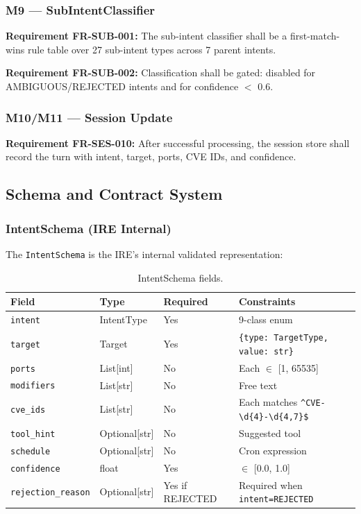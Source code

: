 \documentclass[10pt,journal,onecolumn]{IEEEtran}
\newcommand{\reqid}[1]{\textbf{#1}}
\begin{document}
\subsubsection{M9 --- SubIntentClassifier}
\reqid{Requirement FR-SUB-001:} The sub-intent classifier shall be a first-match-wins rule table over 27 sub-intent types across 7 parent intents.

\reqid{Requirement FR-SUB-002:} Classification shall be gated: disabled for AMBIGUOUS/REJECTED intents and for confidence $<$ 0.6.

\subsubsection{M10/M11 --- Session Update}
\reqid{Requirement FR-SES-010:} After successful processing, the session store shall record the turn with intent, target, ports, CVE IDs, and confidence.
\subsection{Schema and Contract System}

\subsubsection{IntentSchema (IRE Internal)}
The \texttt{IntentSchema} is the IRE's internal validated representation:
\begin{table}[t]
\caption{IntentSchema fields.}
\label{tab:intentschema}
\begin{tabularx}{\textwidth}{>{\ttfamily}l l l X}
\toprule
\textbf{Field} & \textbf{Type} & \textbf{Required} & \textbf{Constraints}\\
\midrule
\texttt{intent} & IntentType & Yes & 9-class enum\\
\texttt{target} & Target & Yes & \texttt{\{type: TargetType, value: str\}}\\
\texttt{ports} & List[int] & No & Each $\in$ [1, 65535]\\
\texttt{modifiers} & List[str] & No & Free text\\
\texttt{cve\_ids} & List[str] & No & Each matches \texttt{\^{}CVE-\textbackslash d\{4\}-\textbackslash d\{4,7\}\$}\\
\texttt{tool\_hint} & Optional[str] & No & Suggested tool\\
\texttt{schedule} & Optional[str] & No & Cron expression\\
\texttt{confidence} & float & Yes & $\in$ [0.0, 1.0]\\
\texttt{rejection\_reason} & Optional[str] & Yes if REJECTED & Required when \texttt{intent=REJECTED}\\
\bottomrule
\end{tabularx}
\end{table}
\end{document}
